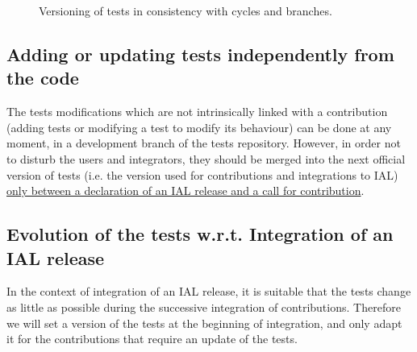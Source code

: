 \documentclass[a4paper,10pt,twoside]{article}
\begin{document}
\begin{appendix}
\begin{figure}[h!]
 \begin{center}
 \end{center}
 \caption{\label{fig:tests_versioning} Versioning of tests in consistency with cycles and branches.}
\end{figure}


\subsection{Adding or updating tests independently from the code\label{sect:add-modify-tests}}

The tests modifications which are not intrinsically linked with a contribution (adding tests or modifying a test to modify its behaviour) can be done at any moment, in a development branch of the tests repository. However, in order not to disturb the users and integrators, they should be merged into the next official version of tests (i.e. the version used for contributions and integrations to IAL) \underline{only between a declaration of an IAL release and a call for contribution}.


\subsection{Evolution of the tests w.r.t. Integration of an IAL release\label{sect:parallel-branches}}

In the context of integration of an IAL release, it is suitable that the tests change as little as possible during the successive integration of contributions. Therefore we will set a version of the tests at the beginning of integration, and only adapt it for the contributions that require an update of the tests.\\


\end{appendix}
\end{document}
